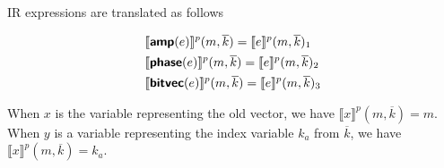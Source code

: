 \documentclass[runningheads]{llncs}
\newcommand {\sem} [1] {\llbracket #1 \rrbracket}
\newcommand {\Psem} [1] {\sem{#1}^p}
\newcommand {\ir} [1] {\textsf{\textbf{#1}}}
\newcommand {\irAmp} {\ir{amp}}
\newcommand {\irPhase} {\ir{phase}}
\newcommand {\irBV} {\ir{bitvec}}
\begin{document}
\noindent
IR expressions are translated as follows

\begin{align*}
  &\Psem{\irAmp(e)}(m, \overline{k}) = \Psem{e}(m, \overline{k})_1\\
  &\Psem{\irPhase(e)}(m, \overline{k}) = \Psem{e}(m, \overline{k})_2\\
  &\Psem{\irBV(e)}(m, \overline{k}) = \Psem{e}(m, \overline{k})_3
\end{align*}

When $x$ is the variable representing the old vector, we have $\Psem{x}(m, \overline{k}) = m$. When $y$ is a variable representing the index variable $k_a$ from $\overline{k}$, we have $\Psem{x}(m, \overline{k}) = k_a$.
\end{document}
